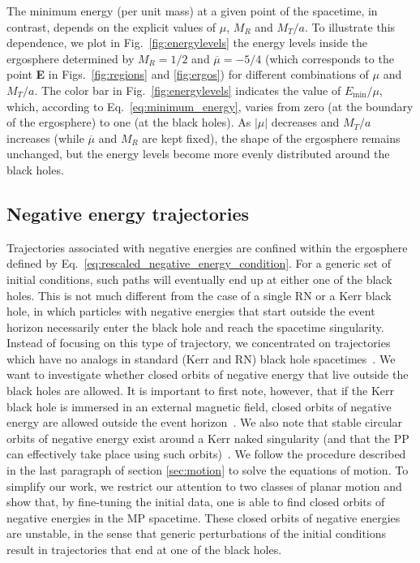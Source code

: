 The minimum energy (per unit mass) at a given point of the spacetime, in contrast, depends on the explicit values of $\mu$, $M_R$ and $M_T/a$. To illustrate this dependence, we plot in Fig.~\ref{fig:energylevels} the energy levels inside the ergosphere determined by $M_R=1/2$ and $\overline \mu = -5/4$ (which corresponds to the point \textbf{E} in Figs.~\ref{fig:regions} and \ref{fig:ergos}) for different combinations of $\mu$ and $M_T/a$. The color bar in Fig.~\ref{fig:energylevels} indicates the value of $E_{\mathrm{min}}/\mu$, which, according to Eq.~\eqref{eq:minimum_energy}, varies from zero (at the boundary of the ergosphere) to one (at the black holes). As $|\mu|$ decreases and $M_T/a$ increases (while $\overline \mu$ and $M_R$ are kept fixed), the shape of the ergosphere remains unchanged, but the energy levels become more evenly distributed around the black holes.

\subsection{Negative energy trajectories}
\label{sec:neg_energy}

Trajectories associated with negative energies are confined within the ergosphere defined by Eq.~\eqref{eq:rescaled_negative_energy_condition}. For a generic set of initial conditions, such paths will eventually end up at either one of the black holes. This is not much different from the case of a single RN or a Kerr black hole, in which particles with negative energies that start outside the event horizon necessarily enter the black hole and reach the spacetime singularity. Instead of focusing on this type of trajectory, we concentrated on trajectories which have no analogs in standard (Kerr and RN) black hole spacetimes~\cite{Grib:2013hxa,Zaslavskii:2020crn}. We want to investigate whether closed orbits of negative energy that live outside the black holes are allowed. It is important to first note, however, that if the Kerr black hole is immersed in an external magnetic field, closed orbits of negative energy are allowed outside the event horizon~\cite{PRASANA1982,FELICE2004}. We also note that stable circular orbits of negative energy exist around a Kerr naked singularity (and that the PP can effectively take place using such orbits)~\cite{STUCHLIK1980}. We follow the procedure described in the last paragraph of section \ref{sec:motion} to solve the equations of motion. To simplify our work, we restrict our attention to two classes of planar motion and show that, by fine-tuning the initial data, one is able to find closed orbits of negative energies in the MP spacetime. These closed orbits of negative energies are unstable, in the sense that generic perturbations of the initial conditions result in trajectories that end at one of the black holes.

